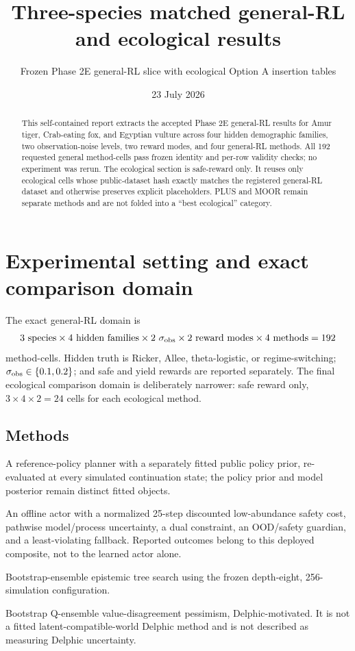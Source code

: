 \documentclass[10pt]{article}
\title{Three-species matched general-RL and ecological results}
\author{Frozen Phase 2E general-RL slice with ecological Option A insertion tables}
\date{23 July 2026}
\begin{document}
\maketitle

\begin{abstract}
This self-contained report extracts the accepted Phase 2E general-RL results for Amur tiger,
Crab-eating fox, and Egyptian vulture across four hidden demographic families, two observation-noise
levels, two reward modes, and four general-RL methods. All 192 requested general method-cells pass
frozen identity and per-row validity checks; no experiment was rerun. The ecological section is
safe-reward only. It reuses only ecological cells whose public-dataset hash exactly matches the
registered general-RL dataset and otherwise preserves explicit placeholders. PLUS and MOOR remain
separate methods and are not folded into a ``best ecological'' category.
\end{abstract}

\tableofcontents

\section{Experimental setting and exact comparison domain}
The exact general-RL domain is
\[
3\ \text{species}\times4\ \text{hidden families}\times2\ \sigma_{\rm obs}
\times2\ \text{reward modes}\times4\ \text{methods}=192
\]
method-cells. Hidden truth is Ricker, Allee, theta-logistic, or regime-switching;
$\sigma_{\rm obs}\in\{0.1,0.2\}$; and safe and yield rewards are reported separately.
The final ecological comparison domain is deliberately narrower: safe reward only,
$3\times4\times2=24$ cells for each ecological method.

\subsection{Methods}
\begin{description}[style=nextline]
\item[RefPlan-inspired.] A reference-policy planner with a separately fitted public policy prior,
re-evaluated at every simulated continuation state; the policy prior and model posterior remain
distinct fitted objects.
\item[OGSRL-inspired.] An offline actor with a normalized 25-step discounted low-abundance safety
cost, pathwise model/process uncertainty, a dual constraint, an OOD/safety guardian, and a
least-violating fallback. Reported outcomes belong to this deployed composite, not to the learned
actor alone.
\item[BA-MCTS-inspired.] Bootstrap-ensemble epistemic tree search using the frozen depth-eight,
256-simulation configuration.
\item[EVD/value-disagreement pessimism.] Bootstrap Q-ensemble value-disagreement pessimism,
Delphic-motivated. It is not a fitted latent-compatible-world Delphic method and is not described
as measuring Delphic uncertainty.
\end{description}
\end{document}
